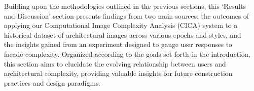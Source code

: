 %



Building upon the methodologies outlined in the previous sections, this `Results and Discussion' section presents findings from two main sources: the outcomes of applying our Computational Image Complexity Analysis (CICA) system to a historical dataset of architectural images across various epochs and styles, and the insights gained from an experiment designed to gauge user responses to facade complexity.
Organized according to the goals set forth in the introduction, this section aims to elucidate the evolving relationship between users and architectural complexity, providing valuable insights for future construction practices and design paradigms.



